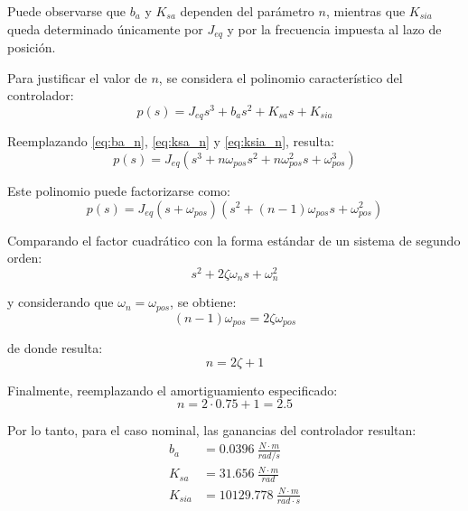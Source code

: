 \documentclass[12pt, a4paper,journal, onecolumn, compsoc]{IEEEtran}
\begin{document}
Puede observarse que $b_a$ y $K_{sa}$ dependen del parámetro $n$, mientras que $K_{sia}$ queda determinado únicamente por $J_{eq}$ y por la frecuencia impuesta al lazo de posición.

Para justificar el valor de $n$, se considera el polinomio característico del controlador:
\begin{equation}
    p(s)=J_{eq}s^3+b_as^2+K_{sa}s+K_{sia}
\end{equation}

Reemplazando \eqref{eq:ba_n}, \eqref{eq:ksa_n} y \eqref{eq:ksia_n}, resulta:
\begin{equation}
    p(s)=J_{eq}\left(s^3+n\omega_{pos}s^2+n\omega_{pos}^2s+\omega_{pos}^3\right)
\end{equation}

Este polinomio puede factorizarse como:
\begin{equation}
    p(s)=J_{eq}(s+\omega_{pos})\left(s^2+(n-1)\omega_{pos}s+\omega_{pos}^2\right)
\end{equation}

Comparando el factor cuadrático con la forma estándar de un sistema de segundo orden:
\begin{equation}
    s^2+2\zeta\omega_ns+\omega_n^2
\end{equation}

y considerando que $\omega_n=\omega_{pos}$, se obtiene:
\begin{equation}
    (n-1)\omega_{pos}=2\zeta\omega_{pos}
\end{equation}

de donde resulta:
\begin{equation}
    n=2\zeta+1
\end{equation}

Finalmente, reemplazando el amortiguamiento especificado:
\begin{equation}
    n=2\cdot0.75+1=2.5
\end{equation}

Por lo tanto, para el caso nominal, las ganancias del controlador resultan:
\begin{equation*}
\begin{aligned}
    b_a &= 0.0396\ \frac{N\cdot m}{rad/s} \\
    K_{sa} &= 31.656\ \frac{N\cdot m}{rad} \\
    K_{sia} &= 10129.778\ \frac{N\cdot m}{rad\cdot s}
\end{aligned}
\end{equation*}
\end{document}
